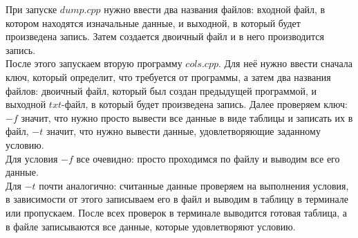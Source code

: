 \begin{spacing}{1}

\indent При запуске $dump.cpp$ нужно ввести два названия файлов: входной файл, в котором находятся изначальные данные, и выходной, в который будет произведена запись. Затем создается двоичный файл и в него производится запись. \\
\indent После этого запускаем вторую программу $cols.cpp.$ Для неё нужно ввести сначала ключ, который определит, 
что требуется от программы, а затем два названия файлов: двоичный файл, который был создан предыдущей программой, 
и выходной $txt$-файл, в который будет произведена запись. Далее проверяем ключ: $-f$ значит, что нужно просто вывести 
все данные в виде таблицы и записать их в файл, $-t$ значит, что нужно вывести данные, удовлетворяющие заданному условию.\\
\indent Для условия $-f$ все очевидно: просто проходимся по файлу и выводим все его данные.\\
\indent Для $-t$ почти аналогично: считанные данные проверяем на выполнения условия, в зависимости от этого записываем его в файл и выводим в таблицу
в терминале или пропускаем. После всех проверок в терминале выводится готовая таблица, а в файле записываются
все данные, которые удовлетворяют условию. 


\end{spacing}